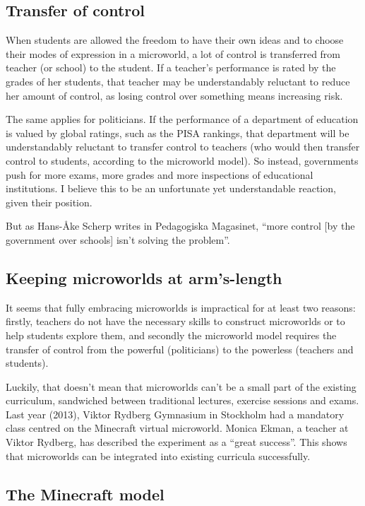 \subsection{Transfer of control}

When students are allowed the freedom to have their own ideas and to choose
their modes of expression in a microworld, a lot of control is transferred from teacher (or school) to the student. If a teacher's performance is rated by the
grades of her students, that teacher may be understandably reluctant to
reduce her amount of control, as losing control over something means
increasing risk.

The same applies for politicians. If the performance of a department of
education is valued by global ratings, such as the PISA rankings, that
department will be understandably reluctant to transfer control to
teachers (who would then transfer control to students, according to the
microworld model). So instead, governments push for more exams, more
grades\cite{dn:bjorklund} and more inspections of educational institutions\cite{pedmag}. I believe this to be an unfortunate yet understandable reaction, given their position.

But as Hans-Åke Scherp writes in Pedagogiska Magasinet, 
``more control [by the government over schools] isn't solving the
problem''\cite{pedmag}.

\subsection{Keeping microworlds at arm's-length}

It seems that fully embracing microworlds is impractical for at least
two reasons: firstly, teachers do not have the necessary skills to
construct microworlds or to help students explore them, and secondly the
microworld model requires the transfer of control from the powerful
(politicians) to the powerless (teachers and students).

Luckily, that doesn't mean that microworlds can't be a small part of the
existing curriculum, sandwiched between traditional lectures, exercise
sessions and exams. Last year (2013), Viktor Rydberg Gymnasium in
Stockholm had a mandatory class centred on the Minecraft virtual
microworld. Monica Ekman, a teacher at Viktor Rydberg, has described the
experiment as a ``great success''\cite{local:minecraft}. This shows that microworlds
can be integrated into existing curricula successfully.

\subsection{The Minecraft model}

